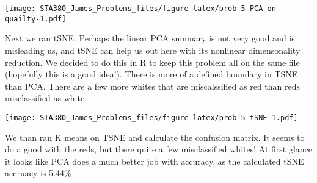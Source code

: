 \documentclass[
]{article}
\newenvironment{Shaded}{\begin{snugshade}}{\end{snugshade}}
\newcommand{\AttributeTok}[1]{\textcolor[rgb]{0.13,0.29,0.53}{#1}}
\newcommand{\DecValTok}[1]{\textcolor[rgb]{0.00,0.00,0.81}{#1}}
\newcommand{\FunctionTok}[1]{\textcolor[rgb]{0.13,0.29,0.53}{\textbf{#1}}}
\newcommand{\NormalTok}[1]{#1}
\newcommand{\OtherTok}[1]{\textcolor[rgb]{0.56,0.35,0.01}{#1}}
\newcommand{\SpecialCharTok}[1]{\textcolor[rgb]{0.81,0.36,0.00}{\textbf{#1}}}
\newcommand{\StringTok}[1]{\textcolor[rgb]{0.31,0.60,0.02}{#1}}
\begin{document}
\texttt{[image: STA380\_James\_Problems\_files/figure-latex/prob 5 PCA on quailty-1.pdf]}

Next we ran tSNE. Perhaps the linear PCA summary is not very good and is
misleading us, and tSNE can help us out here with its nonlinear
dimensonality reduction. We decided to do this in R to keep this problem
all on the same file (hopefully this is a good idea!). There is more of
a defined boundary in TSNE than PCA. There are a few more whites that
are miscalssified as red than reds misclassified as white.

\begin{Shaded}
\end{Shaded}

\texttt{[image: STA380\_James\_Problems\_files/figure-latex/prob 5 tSNE-1.pdf]}

We than ran K means on TSNE and calculate the confusion matrix. It seems
to do a good with the reds, but there quite a few misclassified whites!
At first glance it looks like PCA does a much better job with accuracy,
as the calculated tSNE accruacy is 5.44\%
\end{document}
